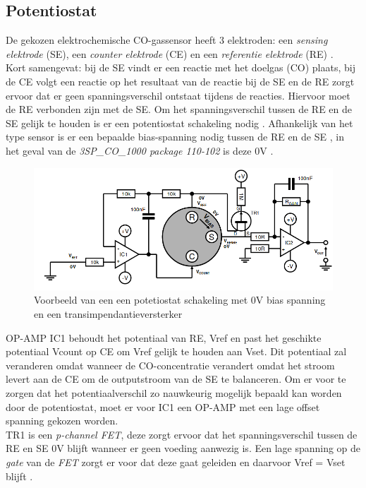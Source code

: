 \documentclass[a4paper, 11pt]{article} %
\begin{document}
	\subsection{Potentiostat} \label{subsec::potentiostat}
	De gekozen elektrochemische CO-gassensor heeft 3 elektroden: een \textit{sensing elektrode} (SE), een \textit{counter elektrode} (CE) en een \textit{referentie elektrode} (RE) \cite{datasheet sensor}.
	\\ Kort samengevat: bij de SE vindt er een reactie met het doelgas (CO) plaats, bij de CE volgt een reactie op het resultaat van de reactie bij de SE en de RE zorgt ervoor dat er geen spanningsverschil ontstaat tijdens de reacties. Hiervoor moet de RE verbonden zijn met de SE. Om het spanningsverschil tussen de RE en de SE gelijk te houden is er een potentiostat schakeling nodig \cite{datasheet sensor}. Afhankelijk van het type sensor is er een bepaalde bias-spanning nodig tussen de RE en de SE \cite{SGX Application note}, in het geval van de \textit{3SP\_CO\_1000 package 110-102} is deze 0V \cite{datasheet sensor}.
	\begin{figure}[h!]
		\centering
		\hspace*{-3cm} 
		\includegraphics[width=1.4\linewidth]{../Media/unbiasedSensorCircuit.png}
		\caption{Voorbeeld van een een potetiostat schakeling met 0V bias spanning en een transimpendantieversterker \cite{SGX Application note}}
		\label{fig::EG_schakeling}
	\end{figure}
	\newpage
	OP-AMP IC1 behoudt het potentiaal van RE, V{\small ref} en past het geschikte potentiaal V{\small count} op CE om V{\small ref} gelijk te houden aan V{\small set}. Dit potentiaal zal veranderen omdat wanneer de CO-concentratie verandert omdat het stroom levert aan de CE om de outputstroom van de SE te balanceren. Om er voor te zorgen dat het potentiaalverschil zo nauwkeurig mogelijk bepaald kan worden door de potentiostat, moet er voor IC1 een OP-AMP met een lage offset spanning gekozen worden.\\
	TR1 is een \textit{p-channel FET}, deze zorgt ervoor dat het spanningsverschil tussen de RE en SE 0V blijft wanneer er geen voeding aanwezig is. Een lage spanning op de \textit{gate} van de \textit{FET} zorgt er voor dat deze gaat geleiden en daarvoor V{\small ref} = V{\small set} blijft \cite{SGX Application note}.
	
\end{document}
